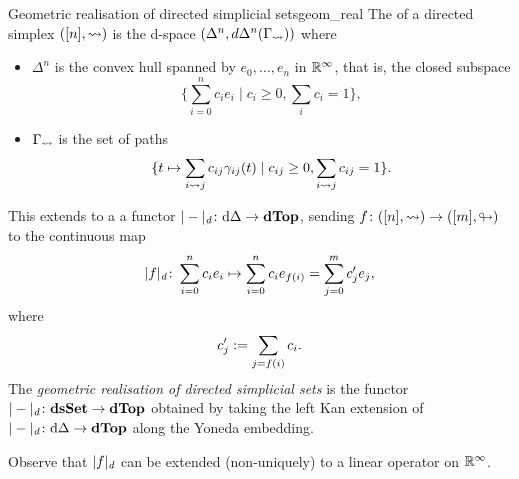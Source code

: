\begin{cdef}{Geometric realisation of directed simplicial sets}{geom_real}
	The  of a directed simplex \( ([n], \rightsquigarrow) \) is the d-space \( (\Delta^n, d\Delta^n(\Gamma_\rightsquigarrow)) \) where 
\begin{itemize}
	\item \( \Delta^n \) is the convex hull spanned by \( e_0, \ldots, e_n \) in \( \mathbb{R}^\infty \), that is, the closed subspace
		\begin{equation*}
			\{ \sum_{i=0}^n c_i e_i \mid c_i \geq 0, \sum_{i}c_i = 1 \},
		\end{equation*}
	\item \( \Gamma_\rightsquigarrow \) is the set of paths
		\begin{equation*}
			\{ t \mapsto \sum_{i\rightsquigarrow j} c_{ij} \gamma_{ij}(t) \mid c_{ij} \geq 0, \sum_{i\rightsquigarrow j} c_{ij} = 1 \}.
		\end{equation*}
\end{itemize}
This extends to a a functor \( |-|_\textit{d}\colon \mathrm{d}\Delta \to \mathbf{dTop} \), sending \( f\colon ([n], \rightsquigarrow) \to ([m], \looparrowright) \) to the continuous map
\begin{equation*}
	|f|_\textit{d} \colon \sum_{i=0}^n c_i e_i \mapsto \sum_{i=0}^n c_i e_{f(i)} = \sum_{j=0}^m c'_j e_j,
\end{equation*}
where 
\begin{equation*}
	c'_j := \sum_{j = f(i)} c_i.
\end{equation*}
The \emph{geometric realisation of directed simplicial sets} is the functor \( |-|_\textit{d}\colon \mathbf{dsSet} \to \mathbf{dTop} \) obtained by taking the left Kan extension of \( |-|_\textit{d}\colon \mathrm{d}\Delta \to \mathbf{dTop} \) along the Yoneda embedding.
\end{cdef}

Observe that \( |f|_\textit{d} \) can be extended (non-uniquely) to a linear operator on \( \mathbb{R}^\infty \).


